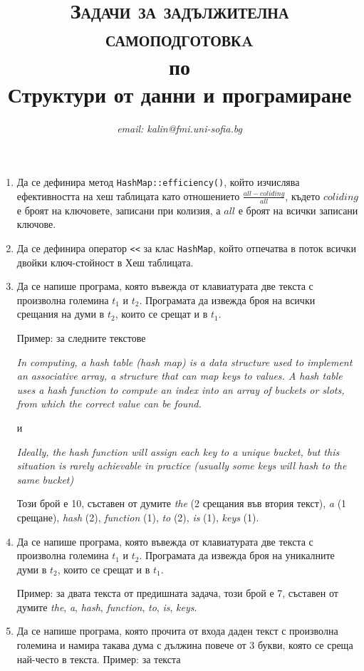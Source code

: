 \documentclass[12pt,a4paper]{article}
\author{\textit{email: kalin@fmi.uni-sofia.bg}}
\title{\textsc{Задачи за задължителна самоподготовкa} \\
по \\
Структури от данни и програмиране}
\begin{document}
\maketitle


\begin{enumerate}

	\item Да се дефинира метод \texttt{HashMap::efficiency()}, който изчислява ефективността на хеш таблицата като отношението  $\frac{all-coliding}{all}$, където $coliding$ е броят на ключовете, записани при колизия, а $all$ е броят на всички записани ключове.


	\item Да се дефинира оператор \texttt{<}\texttt{<} за клас \texttt{HashMap}, който отпечатва в поток всички двойки ключ-стойност в Хеш таблицата.

	\item Да се напише програма, която въвежда от клавиатурата две текста с произволна големина $t_1$ и $t_2$. Програмата да извежда броя на всички срещания на думи в $t_2$, които се срещат и в $t_1$.

	Пример: за следните текстове

	\textit{In computing, a hash table (hash map) is a data structure used to implement an associative array, a structure that can map keys to values. A hash table uses a hash function to compute an index into an array of buckets or slots, from which the correct value can be found.}

	и 

	\textit{Ideally, the hash function will assign each key to a unique bucket, but this situation is rarely achievable in practice (usually some keys will hash to the same bucket)}

	Този брой е 10, съставен от думите \textit {the} (2 срещания във втория текст), \textit{a} (1 срещане), \textit{hash} (2), \textit {function} (1), \textit{to} (2), \textit{is} (1), \textit{keys} (1).


	\item Да се напише програма, която въвежда от клавиатурата две текста с произволна големина $t_1$ и $t_2$. Програмата да извежда броя на уникалните думи в $t_2$, които се срещат и в $t_1$.

	Пример: за двата текста от предишната задача, този брой е 7, съставен от думите \textit {the}, \textit{a}, \textit{hash}, \textit {function}, \textit{to}, \textit{is}, \textit{keys}.


	\item Да се напише програма, която прочита от входа даден текст с произволна големина и намира такава дума с дължина повече от 3 букви, която се среща най-често в текста. Пример: за текста


\end{enumerate}
\end{document}
